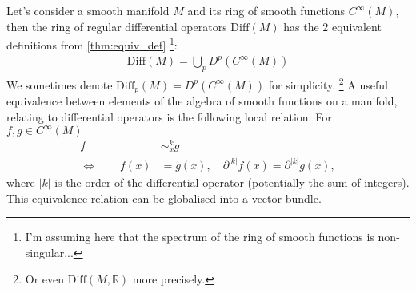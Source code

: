 Let's consider a smooth manifold $M$ and its ring of smooth functions $C^\infty(M)$, then the ring of regular differential operators $\mathrm{Diff}(M)$ has the $2$ equivalent definitions from \cref{thm:equiv_def} 
\footnote{
    I'm assuming here that the spectrum of the ring of smooth functions is non-singular...    
}:
\begin{align}
    \mathrm{Diff}(M) = \bigcup_p D^p(C^\infty(M))
\end{align}
We sometimes denote $\mathrm{Diff}_p(M) = D^p(C^\infty(M))$ for simplicity.
\footnote{
    Or even $\mathrm{Diff}(M, \mathbb{R})$ more precisely.
}
% 
A useful equivalence between elements of the algebra of smooth functions on a manifold, relating to differential operators is the following local relation.
For $f,g \in C^\infty(M)$
\begin{align*}
    f &\sim_x^k g\\
    \Leftrightarrow \qquad f(x) &= g(x), \quad \partial^{|k|} f (x) = \partial^{|k|} g(x),
\end{align*}
where $|k|$ is the order of the differential operator (potentially the sum of integers).
This equivalence relation can be globalised into a vector bundle.
\label{def:jet bundle for manifold}
% 
